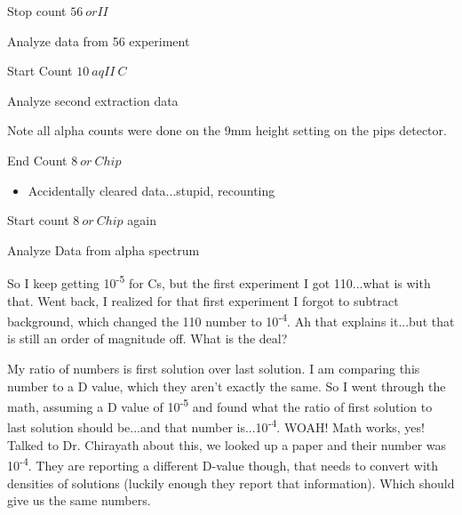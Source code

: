 \documentclass[idxtotoc,hyperref,openany,oneside]{labbook} %
\newcommand{\cmark}{\ding{51}}%
\newcommand{\done}{\rlap{$\square$}{\raisebox{2pt}{\large\hspace{1pt}\cmark}}%
  \hspace{-2.5pt}}
\newcommand{\tss}{\textsuperscript}
\begin{document}


\begin{todolist}
\item[\done]{Stop count $\boxed{56\ orII}$}
\item{Analyze data from 56 experiment}
\end{todolist}

\begin{todolist}
\item[\done]{Start Count $\boxed{10\ aqII\ C}$}
\item{Analyze second extraction data}
\end{todolist}

Note all alpha counts were done on the 9mm height setting
on the pips detector.
\begin{todolist}
\item{End Count $\boxed{8\ or\ Chip}$}
  \begin{itemize}
  \item{Accidentally cleared data...stupid, recounting}
  \end{itemize}
\item[\done]{Start count $\boxed{8\ or\ Chip}$ again}
\item{Analyze Data from alpha spectrum}
\end{todolist}


So I keep getting 10\tss{-5} for Cs, but the first
experiment I got 110...what is with that.
Went back, I realized for that first experiment I forgot
to subtract background, which changed the 110 number
to 10\tss{-4}. Ah that explains it...but that is still
an order of magnitude off. What is the deal?

My ratio of numbers is first solution over last solution.
I am comparing this number to a D value, which they aren't
exactly the same. So I went through the math, assuming a D
value of 10\tss{-5} and found what the ratio of first solution
to last solution should be...and that number is...10\tss{-4}.
WOAH! Math works, yes! Talked to Dr. Chirayath about this,
we looked up a paper and their number was 10\tss{-4}. They
are reporting a different D-value though, that needs to convert
with densities of solutions (luckily enough they report that
information). Which should give us the same numbers.
\end{document}

